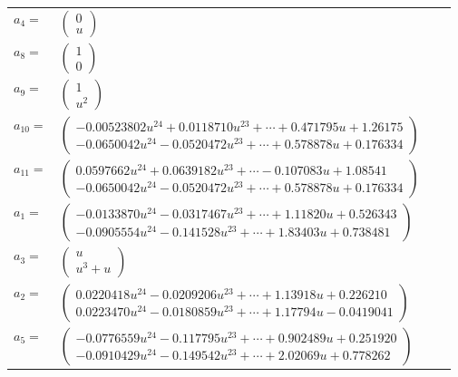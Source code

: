 \documentclass[1p]{elsarticle_modified}
\theoremstyle{definition}
\begin{document}
\begin{tabular}{m{7pt} m{180pt} m{7pt} m{180pt} }
\flushright $a_{4}=$&$\begin{pmatrix}0\\u\end{pmatrix}$ \\
\flushright $a_{8}=$&$\begin{pmatrix}1\\0\end{pmatrix}$ \\
\flushright $a_{9}=$&$\begin{pmatrix}1\\u^2\end{pmatrix}$ \\
\flushright $a_{10}=$&$\begin{pmatrix}-0.00523802 u^{24}+0.0118710 u^{23}+\cdots+0.471795 u+1.26175\\-0.0650042 u^{24}-0.0520472 u^{23}+\cdots+0.578878 u+0.176334\end{pmatrix}$ \\
\flushright $a_{11}=$&$\begin{pmatrix}0.0597662 u^{24}+0.0639182 u^{23}+\cdots-0.107083 u+1.08541\\-0.0650042 u^{24}-0.0520472 u^{23}+\cdots+0.578878 u+0.176334\end{pmatrix}$ \\
\flushright $a_{1}=$&$\begin{pmatrix}-0.0133870 u^{24}-0.0317467 u^{23}+\cdots+1.11820 u+0.526343\\-0.0905554 u^{24}-0.141528 u^{23}+\cdots+1.83403 u+0.738481\end{pmatrix}$ \\
\flushright $a_{3}=$&$\begin{pmatrix}u\\u^3+u\end{pmatrix}$ \\
\flushright $a_{2}=$&$\begin{pmatrix}0.0220418 u^{24}-0.0209206 u^{23}+\cdots+1.13918 u+0.226210\\0.0223470 u^{24}-0.0180859 u^{23}+\cdots+1.17794 u-0.0419041\end{pmatrix}$ \\
\flushright $a_{5}=$&$\begin{pmatrix}-0.0776559 u^{24}-0.117795 u^{23}+\cdots+0.902489 u+0.251920\\-0.0910429 u^{24}-0.149542 u^{23}+\cdots+2.02069 u+0.778262\end{pmatrix}$ \\

\end{tabular}
\end{document}
